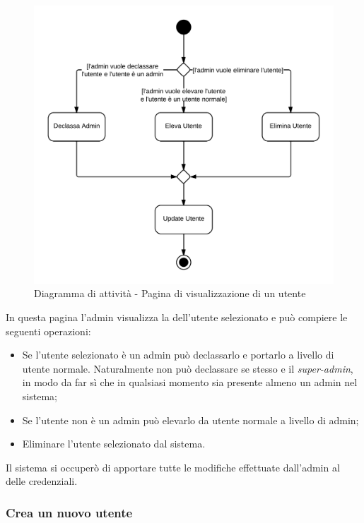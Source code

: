 \begin{figure}[H]
\centering
\includegraphics[scale=0.2]{uml/attivita/MaaP - Apri show-page utente.png}
\caption{Diagramma di attività - Pagina di visualizzazione di un utente}
\end{figure}

In questa pagina l'admin visualizza la  dell'utente selezionato e può compiere le seguenti operazioni:

\begin{itemize}

	\item Se l'utente selezionato è un admin può declassarlo e portarlo a livello di utente normale. Naturalmente non può declassare se stesso e il \textit{super-admin}, in modo da far sì che in qualsiasi momento sia presente almeno un admin nel sistema;
	\item Se l'utente non è un admin può elevarlo da utente normale a livello di admin;
	\item Eliminare l'utente selezionato dal sistema.

\end{itemize}

Il sistema  si occuperò di apportare tutte le modifiche effettuate dall'admin al  delle credenziali.

\subsubsection{Crea un nuovo utente}

